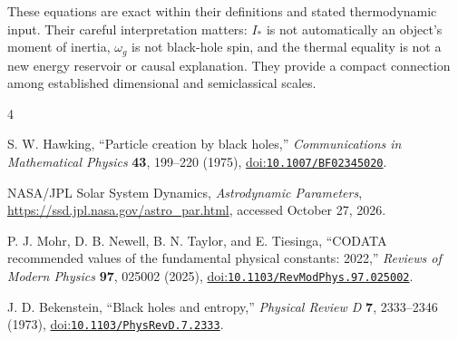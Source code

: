 \documentclass[12pt]{article}
\begin{document}
These equations are exact within their definitions and stated thermodynamic input. Their careful interpretation matters: $I_*$ is not automatically an object's moment of inertia, $\omega_g$ is not black-hole spin, and the thermal equality is not a new energy reservoir or causal explanation. They provide a compact connection among established dimensional and semiclassical scales.

\begin{thebibliography}{4}
\small
{}
\raggedright
{}

S. W. Hawking,
``Particle creation by black holes,''
\emph{Communications in Mathematical Physics} \textbf{43}, 199--220 (1975),
\href{https://doi.org/10.1007/BF02345020}{doi:\nolinkurl{10.1007/BF02345020}}.

NASA/JPL Solar System Dynamics,
\emph{Astrodynamic Parameters},
\url{https://ssd.jpl.nasa.gov/astro_par.html},
accessed October 27, 2026.

P. J. Mohr, D. B. Newell, B. N. Taylor, and E. Tiesinga,
``CODATA recommended values of the fundamental physical constants: 2022,''
\emph{Reviews of Modern Physics} \textbf{97}, 025002 (2025),
\href{https://doi.org/10.1103/RevModPhys.97.025002}{doi:\nolinkurl{10.1103/RevModPhys.97.025002}}.

J. D. Bekenstein,
``Black holes and entropy,''
\emph{Physical Review D} \textbf{7}, 2333--2346 (1973),
\href{https://doi.org/10.1103/PhysRevD.7.2333}{doi:\nolinkurl{10.1103/PhysRevD.7.2333}}.

\end{thebibliography}
\end{document}
